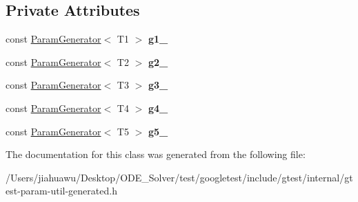 \subsection*{Private Attributes}
\begin{DoxyCompactItemize}
\item 
\mbox{\label{classtesting_1_1internal_1_1_cartesian_product_generator5_a0ede8fe915eb2d3eac08feefd0d7817d}} 
const \mbox{\hyperlink{classtesting_1_1internal_1_1_param_generator}{Param\+Generator}}$<$ T1 $>$ {\bfseries g1\+\_\+}
\item 
\mbox{\label{classtesting_1_1internal_1_1_cartesian_product_generator5_aff9ee5fd2bbe7a492980cf84300a7922}} 
const \mbox{\hyperlink{classtesting_1_1internal_1_1_param_generator}{Param\+Generator}}$<$ T2 $>$ {\bfseries g2\+\_\+}
\item 
\mbox{\label{classtesting_1_1internal_1_1_cartesian_product_generator5_a4a38199385399c6d98b1c0b5887af7e1}} 
const \mbox{\hyperlink{classtesting_1_1internal_1_1_param_generator}{Param\+Generator}}$<$ T3 $>$ {\bfseries g3\+\_\+}
\item 
\mbox{\label{classtesting_1_1internal_1_1_cartesian_product_generator5_a9cb2503ec2518e3b4fa6fa71ab3ead2b}} 
const \mbox{\hyperlink{classtesting_1_1internal_1_1_param_generator}{Param\+Generator}}$<$ T4 $>$ {\bfseries g4\+\_\+}
\item 
\mbox{\label{classtesting_1_1internal_1_1_cartesian_product_generator5_a09555c6b2edb292a8079366d8fe48a1d}} 
const \mbox{\hyperlink{classtesting_1_1internal_1_1_param_generator}{Param\+Generator}}$<$ T5 $>$ {\bfseries g5\+\_\+}
\end{DoxyCompactItemize}


The documentation for this class was generated from the following file\+:\begin{DoxyCompactItemize}
\item 
/\+Users/jiahuawu/\+Desktop/\+O\+D\+E\+\_\+\+Solver/test/googletest/include/gtest/internal/gtest-\/param-\/util-\/generated.\+h\end{DoxyCompactItemize}
